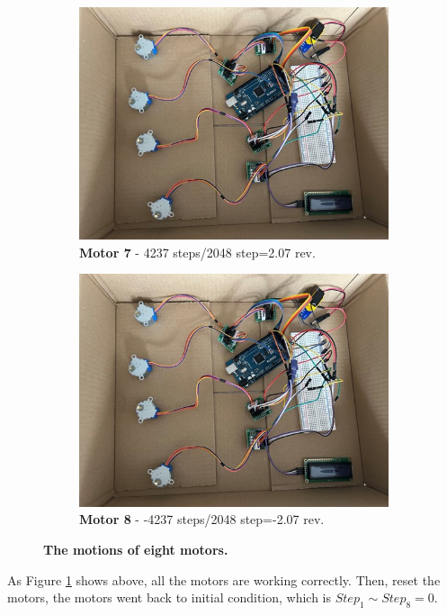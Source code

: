 \begin{figure}[H]
\begin{subfigure}{0.45\textwidth}
        \centering
        \includegraphics[width=\linewidth]{Image/Result/example.jpg}
        \caption{\centering \textbf{Motor 7} - 4237 steps/2048 step=2.07 rev.}
    \end{subfigure}
    \hfill
    \begin{subfigure}{0.45\textwidth} %
        \centering
        \includegraphics[width=\linewidth]{Image/Result/example.jpg}
        \caption{\centering \textbf{Motor 8} - -4237 steps/2048 step=-2.07 rev.}
    \end{subfigure}
    \caption[The motions of eight motors]
    {\centering \textbf{The motions of eight motors.}}
    \label{fig:8motor_motions}
\end{figure}
As Figure \ref{fig:8motor_motions} shows above, all the motors are working correctly.
Then, reset the motors, the motors went back to initial condition, which is $Step_1 \sim Step_8=0$.



\newpage